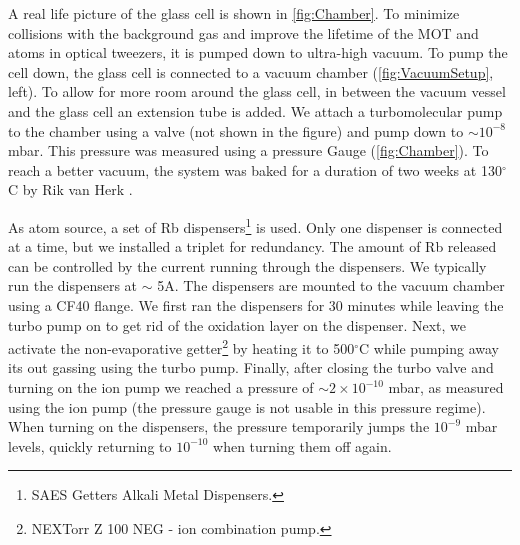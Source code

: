 A real life picture of the glass cell is shown in \cref{fig:Chamber}.
To minimize collisions with the background gas and improve the lifetime of the MOT and atoms in optical tweezers, it is pumped down to ultra-high vacuum. 
To pump the cell down, the glass cell is connected to a vacuum chamber (\cref{fig:VacuumSetup}, left).
To allow for more room around the glass cell, in between the vacuum vessel and the glass cell an extension tube is added.
We attach a turbomolecular pump to the chamber using a valve (not shown in the figure) and pump down to $\sim 10^{-8}$ mbar.
This pressure was measured using a pressure Gauge (\cref{fig:Chamber}).
To reach a better vacuum, the system was baked for a duration of two weeks at 130${}^{\circ}$C by Rik van Herk \cite{Herk2022}.

As atom source, a set of Rb dispensers\footnote{SAES Getters Alkali Metal Dispensers.} is used.
Only one dispenser is connected at a time, but we installed a triplet for redundancy.
The amount of Rb released can be controlled by the current running through the dispensers.
We typically run the dispensers at $\sim$ 5A.
The dispensers are mounted to the vacuum chamber using a CF40 flange.
We first ran the dispensers for 30 minutes while leaving the turbo pump on to get rid of the oxidation layer on the dispenser.
Next, we activate the non-evaporative getter\footnote{NEXTorr Z 100 NEG - ion combination pump.} by heating it to 500${}^{\circ}$C while pumping away its out gassing using the turbo pump. 
Finally, after closing the turbo valve and turning on the ion pump we reached a pressure of $\sim 2\times 10^{-10}$ mbar, as measured using the ion pump (the pressure gauge is not usable in this pressure regime).
When turning on the dispensers, the pressure temporarily jumps the $10^{-9}$ mbar levels, quickly returning to $10^{-10}$ when turning them off again. 


